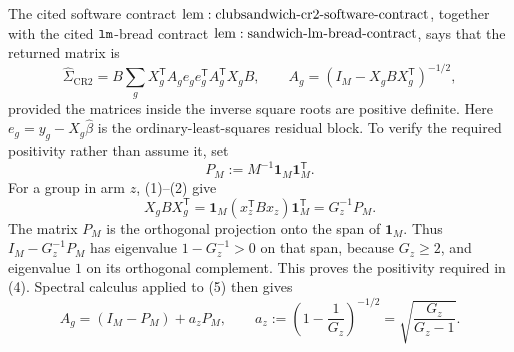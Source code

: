 The cited software contract \({\rm lem:clubsandwich\text{-}cr2\text{-}software\text{-}contract}\), together with the cited \({\tt lm}\)-bread contract \({\rm lem:sandwich\text{-}lm\text{-}bread\text{-}contract}\), says that the returned matrix is
\[
 \widehat\Sigma_{\mathrm{CR2}}
 =B\sum_gX_g^{\mathsf T}A_ge_ge_g^{\mathsf T}A_g^{\mathsf T}X_gB,
 \qquad
 A_g=\left(I_M-X_gBX_g^{\mathsf T}\right)^{-1/2},
 \tag{4}
\]
provided the matrices inside the inverse square roots are positive definite.  Here \(e_g=y_g-X_g\widehat\beta\) is the ordinary-least-squares residual block.  To verify the required positivity rather than assume it, set
\[
 P_M:=M^{-1}\mathbf 1_M\mathbf 1_M^{\mathsf T}.
\]
For a group in arm \(z\), (1)--(2) give
\[
 X_gBX_g^{\mathsf T}
 =\mathbf 1_M(x_z^{\mathsf T}Bx_z)\mathbf 1_M^{\mathsf T}
 =G_z^{-1}P_M.
 \tag{5}
\]
The matrix \(P_M\) is the orthogonal projection onto the span of \(\mathbf 1_M\).  Thus \(I_M-G_z^{-1}P_M\) has eigenvalue \(1-G_z^{-1}>0\) on that span, because \(G_z\ge2\), and eigenvalue \(1\) on its orthogonal complement.  This proves the positivity required in (4).  Spectral calculus applied to (5) then gives
\[
 A_g=(I_M-P_M)+a_zP_M,
 \qquad
 a_z:=\left(1-\frac1{G_z}\right)^{-1/2}
 =\sqrt{\frac{G_z}{G_z-1}}.
 \tag{6}
\]

